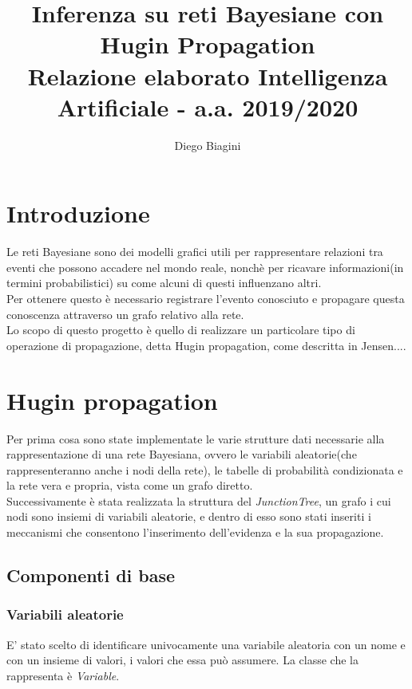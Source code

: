 \documentclass[a4paper]{article}
\title{%
  Inferenza su reti Bayesiane con Hugin Propagation \\
  \large Relazione elaborato Intelligenza Artificiale - a.a. 2019/2020}
\author{Diego Biagini}
\begin{document}
\maketitle


\section{Introduzione}
Le reti Bayesiane sono dei modelli grafici utili per rappresentare relazioni tra eventi che possono accadere nel mondo reale, nonchè per ricavare informazioni(in termini probabilistici) su come alcuni di questi influenzano altri.\\
Per ottenere questo è necessario registrare l'evento conosciuto e propagare questa conoscenza attraverso un grafo relativo alla rete.\\
Lo scopo di questo progetto è quello di realizzare un particolare tipo di operazione di propagazione, detta Hugin propagation, come descritta in Jensen....
\section{Hugin propagation}
Per prima cosa sono state implementate le varie strutture dati necessarie alla rappresentazione di una rete Bayesiana, ovvero le variabili aleatorie(che rappresenteranno anche i nodi della rete), le tabelle di probabilità condizionata e la rete vera e propria, vista come un grafo diretto.\\
Successivamente è stata realizzata la struttura del \emph{JunctionTree}, un grafo i cui nodi sono insiemi di variabili aleatorie, e dentro di esso sono stati inseriti i meccanismi che consentono l'inserimento dell'evidenza e la sua propagazione.
\subsection{Componenti di base}
\subsubsection{Variabili aleatorie}
E' stato scelto di identificare univocamente una variabile aleatoria con un nome e con un insieme di valori, i valori che essa può assumere. La classe che la rappresenta è  \emph{Variable}.
\end{document}
